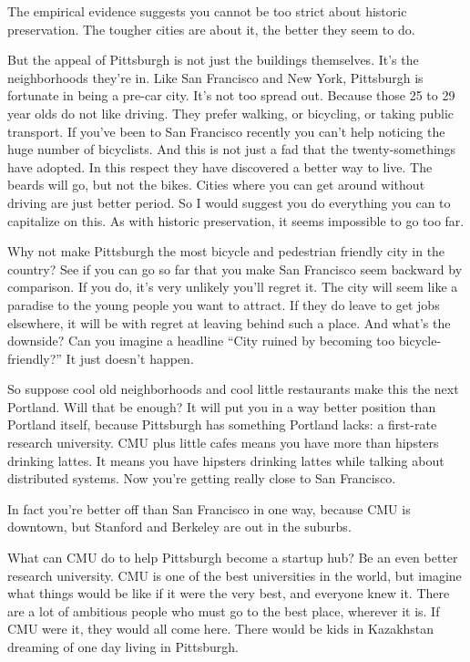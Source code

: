 \documentclass[12pt]{book}
\begin{document}
The empirical evidence suggests you cannot be too strict about historic
preservation. The tougher cities are about it, the better they seem to
do.

But the appeal of Pittsburgh is not just the buildings themselves. It's
the neighborhoods they're in. Like San Francisco and New York,
Pittsburgh is fortunate in being a pre-car city. It's not too spread
out. Because those 25 to 29 year olds do not like driving. They prefer
walking, or bicycling, or taking public transport. If you've been to San
Francisco recently you can't help noticing the huge number of
bicyclists. And this is not just a fad that the twenty-somethings have
adopted. In this respect they have discovered a better way to live. The
beards will go, but not the bikes. Cities where you can get around
without driving are just better period. So I would suggest you do
everything you can to capitalize on this. As with historic preservation,
it seems impossible to go too far.

Why not make Pittsburgh the most bicycle and pedestrian friendly city in
the country? See if you can go so far that you make San Francisco seem
backward by comparison. If you do, it's very unlikely you'll regret it.
The city will seem like a paradise to the young people you want to
attract. If they do leave to get jobs elsewhere, it will be with regret
at leaving behind such a place. And what's the downside? Can you imagine
a headline ``City ruined by becoming too bicycle-friendly?'' It just
doesn't happen.

So suppose cool old neighborhoods and cool little restaurants make this
the next Portland. Will that be enough? It will put you in a way better
position than Portland itself, because Pittsburgh has something Portland
lacks: a first-rate research university. CMU plus little cafes means you
have more than hipsters drinking lattes. It means you have hipsters
drinking lattes while talking about distributed systems. Now you're
getting really close to San Francisco.

In fact you're better off than San Francisco in one way, because CMU is
downtown, but Stanford and Berkeley are out in the suburbs.

What can CMU do to help Pittsburgh become a startup hub? Be an even
better research university. CMU is one of the best universities in the
world, but imagine what things would be like if it were the very best,
and everyone knew it. There are a lot of ambitious people who must go to
the best place, wherever it is. If CMU were it, they would all come
here. There would be kids in Kazakhstan dreaming of one day living in
Pittsburgh.
\end{document}
